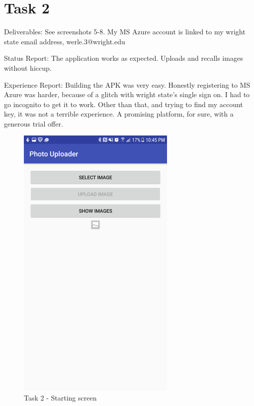 \documentclass{article}
\begin{document}
\section{Task 2}
Deliverables: See screenshots 5-8. My MS Azure account is linked to my wright state email address, werle.3@wright.edu

Status Report: The application works as expected. Uploads and recalls images without hiccup.

Experience Report: Building the APK was very easy. Honestly registering to MS Azure was harder, because of a glitch with wright state's single sign on. I had to go incognito to get it to work. Other than that, and trying to find my account key, it was not a terrible experience. A promising platform, for sure, with a generous trial offer.

	\begin{figure}[ht]
		\includegraphics[width=3in]{img/t2s1.png}
		\centering
		\caption{Task 2 - Starting screen}
	\end{figure}
\end{document}
